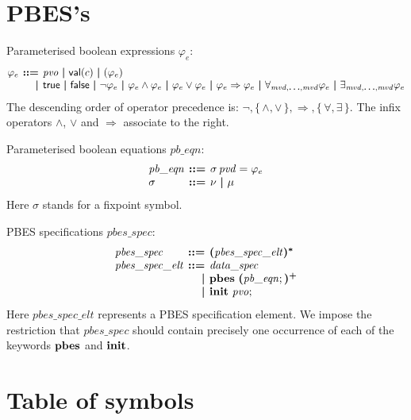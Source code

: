 \documentclass[a4paper,fleqn,10pt]{article}
\makeatletter
\newcommand{\f}[1]{\ensuremath{\mathit{#1}}}
\newenvironment{tightarray}[1]
  {\setlength{\arraycolsep}{2pt}%
   \begin{array}{@{}#1@{}}%
  }
  {\end{array}%
  }
\newcommand{\set}[1]{\ensuremath{\{\,#1\,\}}}
\newcommand{\limp}{\ensuremath{\Rightarrow}}
\newcommand{\mb}[1]{\text{\boldmath$#1$}}
\newcommand{\kwinit}{{\bf init}}
\newcommand{\kwpbes}{{\bf pbes}}
\makeatother
\begin{document}
\section{PBES's}

Parameterised boolean expressions $\varphi_e$:
\[\begin{tightarray}{lrl}
\varphi_e & \mb{::=} & \f{pvo}\ \mb{|}\ 
                       \mathsf{val}(c)\ \mb{|}\ 
                       ( \varphi_e )\\ 
          & \mb{|}   & \mathsf{true}\ \mb{|}\ 
                       \mathsf{false}\ \mb{|}\ 
                       \neg \varphi_e\ \mb{|}\ 
                       \varphi_e \land \varphi_e\ \mb{|}\ 
                       \varphi_e \lor \varphi_e\ \mb{|}\ 
                       \varphi_e \limp \varphi_e\ \mb{|}\ 
                       \forall_{\f{mvd},\mb{\ldots},\f{mvd}} \varphi_e\ \mb{|}\ 
                       \exists_{\f{mvd},\mb{\ldots},\f{mvd}} \varphi_e\\ 
\end{tightarray}\]
The descending order of operator precedence is: $\neg, \set{\land, \lor}, \limp, \set{\forall, \exists}$.  
The infix operators $\land$, $\lor$ and $\limp$ associate to the right.

Parameterised boolean equations $\f{pb\_eqn}$:
\[\begin{tightarray}{lrl}
\f{pb\_eqn} & \mb{::=} & \sigma\,\f{pvd} = \varphi_e\\
\sigma      & \mb{::=} & \nu\ \mb{|}\ \mu
\end{tightarray}\]
Here $\sigma$ stands for a fixpoint symbol.

PBES specifications $\f{pbes\_spec}$:
\[\begin{tightarray}{lrl}
\f{pbes\_spec}      & \mb{::=} & \mb{(}\f{pbes\_spec\_elt}\mb{)^{*}}\\
\f{pbes\_spec\_elt} & \mb{::=} & \f{data\_spec}\\
                    & \mb{|} & \kwpbes\ \mb{(}\f{pb\_eqn};\mb{)^{+}}\\
                    & \mb{|} & \kwinit\ \f{pvo};
\end{tightarray}\]
Here $\f{pbes\_spec\_elt}$ represents a PBES specification element. We impose the restriction that $\f{pbes\_spec}$ should contain precisely one occurrence of each of the keywords $\kwpbes$ and $\kwinit$.

\newpage

\section{Table of symbols}
\label{sec:symbols}
\end{document}
